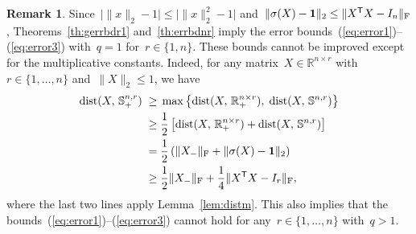 \documentclass[11pt,a4paper]{article}  %
\theoremstyle{definition}
\newtheorem{remark}{Remark}%
\DeclareMathOperator{\dist}{dist}
\newcommand{\RR}{\mathbb{R}}
\newcommand{\col}{r}
\newcommand{\stf}[1]{\mathbb{S}^{#1}}
\newcommand{\fro}{{\scriptstyle{\textnormal{F}}}}
\newcommand{\trs}{{\scriptstyle{\mathsf{T}}}}
\newcommand{\ones}{\mathbf{1}}
\begin{document}
\begin{remark}\label{remark1}
Since~$\big|\|x\|_2- 1\big|\le \big|\|x\|^2_2- 1\big|$
and~$\|\sigma(X) - \ones\|_2\le\|X^\trs X-I_n\|_{\fro}$,
Theorems~\ref{th:gerrbdr1} and~\ref{th:errbdnr}
imply the error bounds~(\ref{eq:error1})--(\ref{eq:error3}) with~$q=1$ for~$\col\in\{1,n\}$.
These bounds cannot be improved except for the multiplicative constants. Indeed,
for any matrix~$X\in \RR^{n\times \col}$ with~$\col\in \{1, \dots, n\}$ and~{$\|X\|_2 \le 1$},
we have
\begin{equation}
\label{eq:lowerdist}
\begin{split}
\dist(X,\, \stf{n,\col}_+)
\;\ge\; & \max\left\{\dist(X,\, \RR^{n\times \col}_+),\; \dist(X,\, \stf{n,\col})\right\} \\
\;\ge\; & \frac{1}{2}\left[\dist(X,\, \RR^{n\times \col}_+) + \dist(X,\, \stf{n,\col})\right] \\
\;=\; & \frac{1}{2}\left(\|X_{-}\|_\fro + \|\sigma(X) -\ones\|_2\right) \\
\;\ge\; & \frac{1}{2}\|X_{-}\|_\fro + \frac{1}{4}\|X^\trs X -I_\col\|_\fro,
\end{split}
\end{equation}
where the last two lines apply Lemma~\ref{lem:distm}.
This also implies that the bounds~\mbox{(\ref{eq:error1})--(\ref{eq:error3})}
cannot hold for any~$\col\in\{1, \dots,n\}$ with~$q>1$.
\end{remark}
\end{document}
